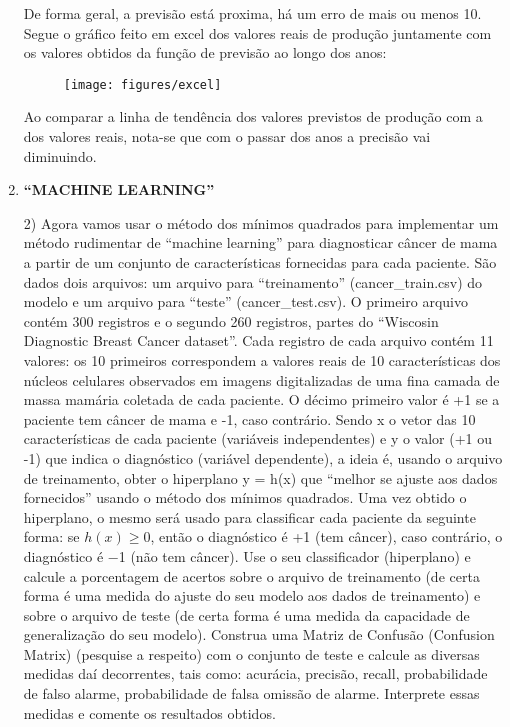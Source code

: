 \documentclass[leqno]{article}
\numberwithin{equation}{section}
\begin{document}
\begin{enumerate}
De forma geral, a previsão está proxima, há um erro de mais ou menos 10. Segue o gráfico feito em excel dos valores reais de produção juntamente com os valores obtidos da função de previsão ao longo dos anos:

\begin{figure}[H]
	\centering
	\texttt{[image: figures/excel]}
\end{figure}

Ao comparar a linha de tendência dos valores previstos de produção com a dos valores reais, nota-se que com o passar dos anos a precisão vai diminuindo.
 \newpage
\item  \textbf{{\large “MACHINE LEARNING”}}\\

\begin{tcolorbox}[colback=green!5,colframe=green!40!black]
	2) Agora vamos usar o método dos mínimos quadrados para implementar um
	método rudimentar de “machine learning” para diagnosticar câncer de
	mama a partir de um conjunto de características fornecidas para cada
	paciente. São dados dois arquivos: um arquivo para “treinamento”
	(cancer\_train.csv) do modelo e um arquivo para “teste” (cancer\_test.csv).
	O primeiro arquivo contém 300 registros e o segundo 260 registros, partes
	do “Wiscosin Diagnostic Breast Cancer dataset”. Cada registro de cada
	arquivo contém 11 valores: os 10 primeiros correspondem a valores reais
	de 10 características dos núcleos celulares observados em imagens
	digitalizadas de uma fina camada de massa mamária coletada de cada
	paciente. O décimo primeiro valor é +1 se a paciente tem câncer de mama
	e -1, caso contrário.
	Sendo x o vetor das 10 características de cada paciente (variáveis
	independentes) e y o valor (+1 ou -1) que indica o diagnóstico (variável
	dependente), a ideia é, usando o arquivo de treinamento, obter o hiperplano
	y = h(x) que “melhor se ajuste aos dados fornecidos” usando o método dos mínimos quadrados.
	Uma vez obtido o hiperplano, o mesmo será usado para classificar cada
	paciente da seguinte forma: se $h(x) \geq 0$, então o diagnóstico é +1 (tem
	câncer), caso contrário, o diagnóstico é −1 (não tem câncer).
	Use o seu classificador (hiperplano) e calcule a porcentagem de acertos
	sobre o arquivo de treinamento (de certa forma é uma medida do ajuste do
	seu modelo aos dados de treinamento) e sobre o arquivo de teste (de certa
	forma é uma medida da capacidade de generalização do seu modelo).
	Construa uma Matriz de Confusão (Confusion Matrix) (pesquise a respeito)
	com o conjunto de teste e calcule as diversas medidas daí decorrentes, tais
	como: acurácia, precisão, recall, probabilidade de falso alarme,
	probabilidade de falsa omissão de alarme. Interprete essas medidas e
	comente os resultados obtidos.
\end{tcolorbox}	


\end{enumerate}
\end{document}
